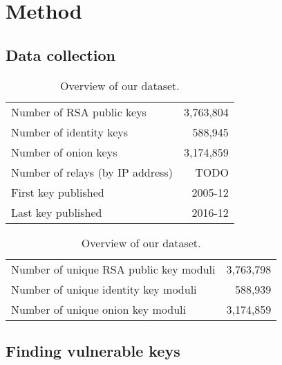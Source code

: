 \section{Method}

\subsection{Data collection}

\begin{table}[t]
	\centering
	\begin{tabular}{l r}
	\toprule
	Number of RSA public keys & 3,763,804 \\
	Number of identity keys & 588,945 \\
	Number of onion keys & 3,174,859 \\
	\midrule
	Number of relays (by IP address) & TODO \\
	First key published & 2005-12 \\
	Last key published & 2016-12 \\
	\bottomrule
	\end{tabular}
	\caption{Overview of our dataset.}
	\label{tab:dataset}
\end{table}

\begin{table}[t]
	\centering
	\begin{tabular}{l r}
	\toprule
	Number of unique RSA public key moduli & 3,763,798 \\
	Number of unique identity key moduli & 588,939 \\
	Number of unique onion key moduli & 3,174,859 \\
	\bottomrule
	\end{tabular}
	\caption{Overview of our dataset.}
	\label{tab:dataset}
\end{table}

\subsection{Finding vulnerable keys}
